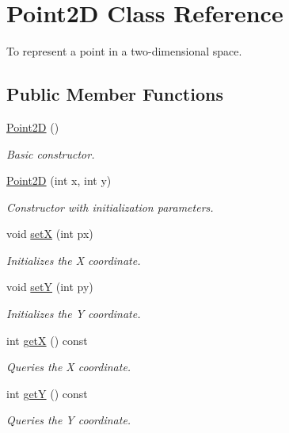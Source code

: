 \hypertarget{classPoint2D}{}\section{Point2D Class Reference}
\label{classPoint2D}


To represent a point in a two-\/dimensional space.  


\subsection*{Public Member Functions}
\begin{DoxyCompactItemize}
\item 
\mbox{\label{classPoint2D_a2415006d697f1c222c17254bdd302098}} 
\hyperlink{classPoint2D_a2415006d697f1c222c17254bdd302098}{Point2D} ()
\begin{DoxyCompactList}\small\item\em Basic constructor. \end{DoxyCompactList}\item 
\hyperlink{classPoint2D_a925d8fbd28c1bec7ff05f24c9ce8d182}{Point2D} (int x, int y)
\begin{DoxyCompactList}\small\item\em Constructor with initialization parameters. \end{DoxyCompactList}\item 
void \hyperlink{classPoint2D_af268842e8f2e6072ffe345dc2f322046}{setX} (int px)
\begin{DoxyCompactList}\small\item\em Initializes the X coordinate. \end{DoxyCompactList}\item 
void \hyperlink{classPoint2D_a0e08240b54e6eaae92c979082da1c91c}{setY} (int py)
\begin{DoxyCompactList}\small\item\em Initializes the Y coordinate. \end{DoxyCompactList}\item 
int \hyperlink{classPoint2D_a5cb1c2584e5b2bada0226a3e32aa2b1a}{getX} () const
\begin{DoxyCompactList}\small\item\em Queries the X coordinate. \end{DoxyCompactList}\item 
int \hyperlink{classPoint2D_a53d10f2e460c47a493a3fbadfbafbb64}{getY} () const
\begin{DoxyCompactList}\small\item\em Queries the Y coordinate. \end{DoxyCompactList}\item 

\end{DoxyCompactItemize}
